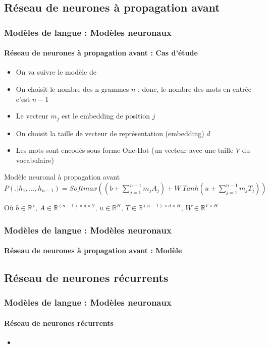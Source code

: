 \documentclass[xcolor=table]{beamer}
\begin{document}
\subsection{Réseau de neurones à propagation avant}

\begin{frame}
\frametitle{Modèles de langue : Modèles neuronaux}
\framesubtitle{Réseau de neurones à propagation avant : Cas d'étude}

\begin{itemize}
	\item On va suivre le modèle de \cite{2003-bengio-al}
	\item On choisit le nombre des n-grammes $n$ ; donc, le nombre des mots en entrée c'est $n-1$
	\item Le vecteur $m_j$ est le embedding de position $j$
	\item On choisit la taille de vecteur de représentation (embedding) $d$
	\item Les mots sont encodés sous forme One-Hot (un vecteur avec une taille $V$ du vocabulaire)
\end{itemize}

\begin{block}{Modèle neuronal à propagation avant}
	$
	P(.|h_1,\ldots, h_{n-1}) = 
	Softmax \left(
	(b + \sum\limits_{j=1}^{n-1} m_j A_j) 
	+ 
	W\ Tanh(u + \sum\limits_{j=1}^{n-1} m_j T_j)
	\right)
	$
	
	Où $b \in \mathbb{R}^{V},\, A \in \mathbb{R}^{(n-1) \times d \times V},\, u \in \mathbb{R}^{H},\, T \in \mathbb{R}^{(n-1) \times d \times H},\, W \in \mathbb{R}^{V \times H}$
\end{block}

\end{frame}

\begin{frame}
\frametitle{Modèles de langue : Modèles neuronaux}
\framesubtitle{Réseau de neurones à propagation avant : Modèle}


\end{frame}

\subsection{Réseau de neurones récurrents}

\begin{frame}
\frametitle{Modèles de langue : Modèles neuronaux}
\framesubtitle{Réseau de neurones récurrents}

\begin{itemize}
	\item 
\end{itemize}

\end{frame}
\end{document}
